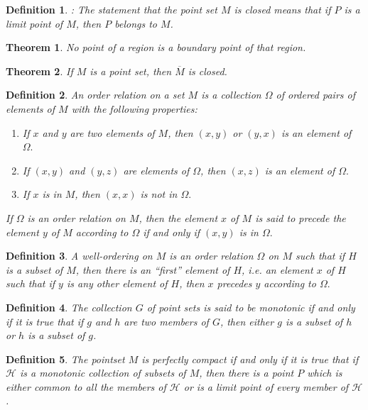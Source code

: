 \documentclass[10pt]{report}
\newtheorem{theorem}{Theorem}
\newtheorem{definition}{Definition}
\newcommand{\cl}[1]{\overline{#1}}
\begin{document}
\begin{definition}: The statement that the point set $M$ is closed means that if
$P$ is a limit point of $M$, then $P$ belongs to $M$.\\
\end{definition}

\begin{theorem} No point of a region is a boundary point of that region.\\
\end{theorem}

\begin{theorem} If $M$ is a point set, then ${\cl{M}}$ is closed.\\
\end{theorem}

\begin{definition}
 An order relation on a set $M$ is a collection $\Omega$ of ordered pairs of
elements of $M$ with the following properties:
\begin{enumerate}
 \item If $x$ and $y$ are two elements of $M$, then $(x,y)$ or $(y,x)$ is an
element of $\Omega.$
 \item If $(x,y)$ and $(y,z)$ are elements of $\Omega$, then $(x,z)$ is an element
of $\Omega.$
 \item If $x$ is in $M$, then $(x,x)$ is not in $\Omega.$
\end{enumerate}
If $\Omega$ is an order relation on $M$, then the element $x$ of $M$ is said to
precede the element $y$ of $M$ according to $\Omega$ if and only if $(x,y)$ is
in $\Omega.$
\end{definition}

\begin{definition}
 A well-ordering on $M$ is an order relation $\Omega$ on $M$ such that if $H$ is
a subset of $M$, then there is an ``first'' element of $H$, i.e. an element $x$
of $H$ such that if $y$ is any other element of $H$, then $x$ precedes $y$
according to $\Omega.$
\end{definition}

\begin{definition}
 The collection $G$ of point sets is said to be monotonic if and only if it is
true that if $g$ and $h$ are two members of $G$, then either $g$ is a subset of
$h$ or $h$ is a subset of $g$.
\end{definition}

\begin{definition}
 The pointset $M$ is perfectly compact if and only if it is true that if
$\mathcal{H}$ is a monotonic collection of subsets of $M$, then there is a point
$P$ which is either common to all the members of $\mathcal{H}$ or is a limit
point of every member of $\mathcal{H}$.
\end{definition}
\end{document}

